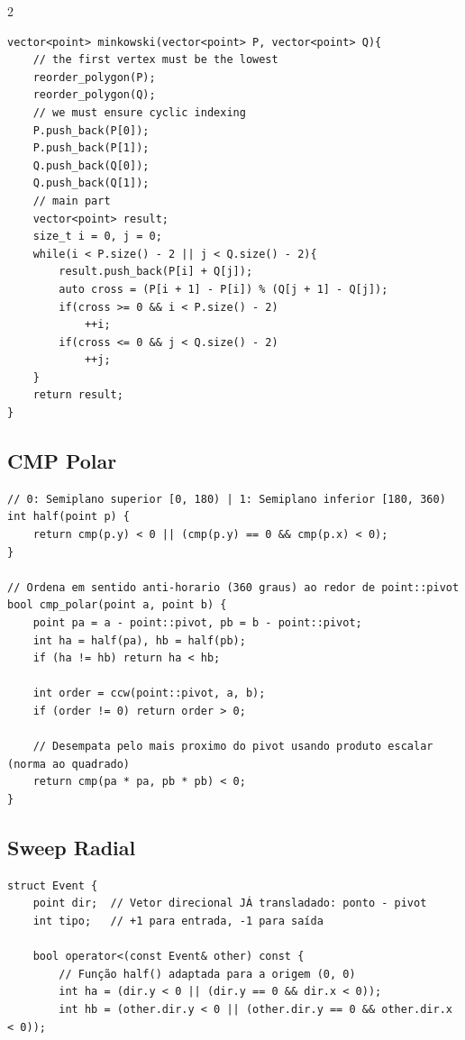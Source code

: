 \documentclass[11pt]{article}
\begin{document}
\begin{multicols}{2}
\begin{lstlisting}
vector<point> minkowski(vector<point> P, vector<point> Q){
    // the first vertex must be the lowest
    reorder_polygon(P);
    reorder_polygon(Q);
    // we must ensure cyclic indexing
    P.push_back(P[0]);
    P.push_back(P[1]);
    Q.push_back(Q[0]);
    Q.push_back(Q[1]);
    // main part
    vector<point> result;
    size_t i = 0, j = 0;
    while(i < P.size() - 2 || j < Q.size() - 2){
        result.push_back(P[i] + Q[j]);
        auto cross = (P[i + 1] - P[i]) % (Q[j + 1] - Q[j]);
        if(cross >= 0 && i < P.size() - 2)
            ++i;
        if(cross <= 0 && j < Q.size() - 2)
            ++j;
    }
    return result;
}

\end{lstlisting}

\subsection{CMP Polar}

\begin{lstlisting}
// 0: Semiplano superior [0, 180) | 1: Semiplano inferior [180, 360)
int half(point p) {
    return cmp(p.y) < 0 || (cmp(p.y) == 0 && cmp(p.x) < 0);
}

// Ordena em sentido anti-horario (360 graus) ao redor de point::pivot
bool cmp_polar(point a, point b) {
    point pa = a - point::pivot, pb = b - point::pivot;
    int ha = half(pa), hb = half(pb);
    if (ha != hb) return ha < hb;
    
    int order = ccw(point::pivot, a, b);
    if (order != 0) return order > 0;
    
    // Desempata pelo mais proximo do pivot usando produto escalar (norma ao quadrado)
    return cmp(pa * pa, pb * pb) < 0;
}
\end{lstlisting}

\subsection{Sweep Radial}

\begin{lstlisting}
struct Event {
    point dir;  // Vetor direcional JÁ transladado: ponto - pivot
    int tipo;   // +1 para entrada, -1 para saída
    
    bool operator<(const Event& other) const {
        // Função half() adaptada para a origem (0, 0)
        int ha = (dir.y < 0 || (dir.y == 0 && dir.x < 0));
        int hb = (other.dir.y < 0 || (other.dir.y == 0 && other.dir.x < 0));
        

\end{lstlisting}
\end{multicols}
\end{document}
